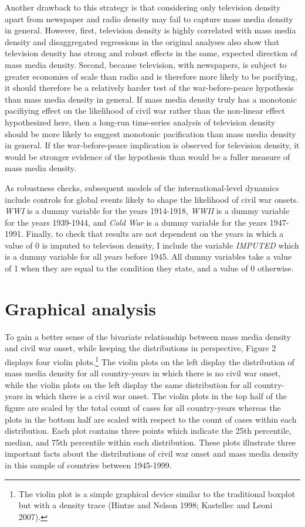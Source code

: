 \documentclass[11pt,article,oneside]{memoir}
\begin{document}
Another drawback to this strategy is that considering only television
density apart from newspaper and radio density may fail to capture mass
media density in general. However, first, television density is highly
correlated with mass media density and disaggregated regressions in the
original analyses also show that television density has strong and
robust effects in the same, expected direction of mass media density.
Second, because television, with newspapers, is subject to greater
economies of scale than radio and is therefore more likely to be
pacifying, it should therefore be a relatively harder test of the
war-before-peace hypothesis than mass media density in general. If mass
media density truly has a monotonic pacifiying effect on the likelihood
of civil war rather than the non-linear effect hypothesized here, then a
long-run time-series analysis of television density should be more
likely to suggest monotonic pacification than mass media density in
general. If the war-before-peace implication is observed for television
density, it would be stronger evidence of the hypothesis than would be a
fuller measure of mass media density.

As robustness checks, subsequent models of the international-level
dynamics include controls for global events likely to shape the
likelihood of civil war onsets. \emph{WWI} is a dummy variable for the
years 1914-1918, \emph{WWII} is a dummy variable for the years
1939-1944, and \emph{Cold War} is a dummy variable for the years
1947-1991. Finally, to check that results are not dependent on the years
in which a value of 0 is imputed to televison density, I include the
variable \emph{IMPUTED} which is a dummy variable for all years before
1945. All dummy variables take a value of 1 when they are equal to the
condition they state, and a value of 0 otherwise.

\section{Graphical analysis}\label{graphical-analysis}

To gain a better sense of the bivariate relationship between mass media
density and civil war onset, while keeping the distributions in
perspective, Figure 2 displays four violin plots.\footnote{The violin
  plot is a simple graphical device similar to the traditional boxplot
  but with a density trace (Hintze and Nelson 1998; Kastellec and Leoni
  2007).} The violin plots on the left display the distribution of mass
media density for all country-years in which there is no civil war
onset, while the violin plots on the left display the same distribution
for all country-years in which there is a civil war onset. The violin
plots in the top half of the figure are scaled by the total count of
cases for all country-years whereas the plots in the bottom half are
scaled with respect to the count of cases within each distribution. Each
plot contains three points which indicate the 25th percentile, median,
and 75th percentile within each distribution. These plots illustrate
three important facts about the distributions of civil war onset and
mass media density in this sample of countries between 1945-1999.
\end{document}
